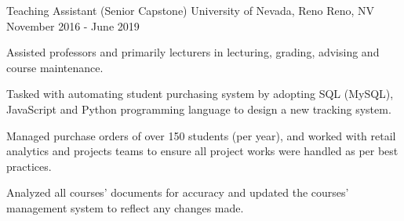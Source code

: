 \begin{cventries}
  \cventry
    {Teaching Assistant (Senior Capstone)} %
    {University of Nevada, Reno} %
    {Reno, NV} %
    {November 2016 - June 2019} %
    {
      \begin{cvitems} %
        \item { Assisted professors and primarily lecturers in lecturing, grading, advising and course maintenance.}
		\item {  Tasked with automating student purchasing system by adopting SQL (MySQL), JavaScript and Python programming language to design a new tracking system.}
		\item {  Managed purchase orders of over 150 students (per year), and worked with retail analytics and projects teams to ensure all project works were handled as per best practices.}
		\item {  Analyzed all courses' documents for accuracy and updated the courses' management system to reflect any changes made.}
      \end{cvitems}
    }

\end{cventries}
